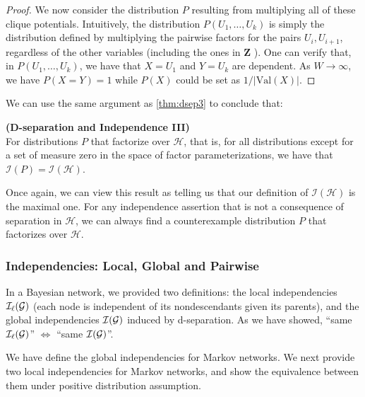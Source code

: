 \documentclass{article}
\newcommand{\bfs}[1]{\textbf{({#1}) }}
\begin{document}
\begin{proof}
We now consider the distribution $P$ resulting from multiplying all of these clique potentials. Intuitively, the distribution $P\left(U_{1}, \ldots, U_{k}\right)$ is simply the distribution defined by multiplying the pairwise factors for the pairs $U_{i}, U_{i+1}$, regardless of the other variables (including the ones in $\boldsymbol{Z}$ ). One can verify that, in $P\left(U_{1}, \ldots, U_{k}\right)$, we have that $X=U_{1}$ and $Y=U_{k}$ are dependent.  As ${W} \rightarrow \infty$, we have $P(X=Y)=1$ while $P(X)$ could be set as $1/|\mathrm{Val}(X)|$.
\end{proof}


We can use the same argument as \cref{thm:dsep3} to conclude that: 
\begin{thma}\bfs{D-separation and Independence III}\label{thm:sep3} \\
For  distributions $P$ that factorize over $\mathcal{H}$, that is, for all distributions except for a set of measure zero in the space of factor parameterizations, we have that $\mathcal{I}(P)=\mathcal{I}(\mathcal{H})$.
\end{thma}


Once again, we can view this result as telling us that our definition of $\mathcal{I}(\mathcal{H})$ is the maximal one. For any independence assertion that is not a consequence of separation in $\mathcal{H}$, we can always find a counterexample distribution $P$ that factorizes over $\mathcal{H}$.

\subsubsection{Independencies: Local, Global and Pairwise}\label{sec:loc_pair_glo}
In a Bayesian network, we provided two definitions: the local independencies $\mathcal{I}_\ell(\mathcal{G})$ (each node is independent of its nondescendants given its parents), and the global independencies  $\mathcal{I}(\mathcal{G})$ induced by d-separation. As we have showed, ``same $\mathcal{I}_\ell(\mathcal{G})$'' $\Leftrightarrow$ ``same $\mathcal{I}(\mathcal{G})$''.

We have define the global independencies for Markov networks. We next provide two local independencies for Markov networks, and show the equivalence between them under positive distribution assumption.
\end{document}
